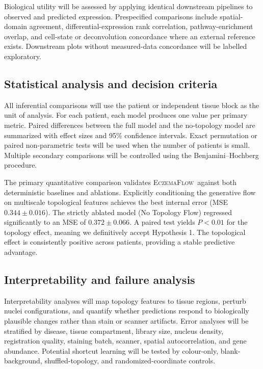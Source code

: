 \documentclass[nocrop]{bioinfo}
\newcommand{\softwarename}{\textsc{EczemaFlow}}
\begin{document}
Biological utility will be assessed by applying identical downstream
pipelines to observed and predicted expression. Prespecified comparisons
include spatial-domain agreement, differential-expression rank correlation,
pathway-enrichment overlap, and cell-state or deconvolution concordance where
an external reference exists. Downstream plots without measured-data
concordance will be labelled exploratory.

\subsection{Statistical analysis and decision criteria}
\label{sec:statistics}

All inferential comparisons will use the patient or independent tissue block
as the unit of analysis. For each patient, each model produces one value per
primary metric. Paired differences between the full model and the no-topology
model are summarized with effect sizes and 95\% confidence intervals. Exact
permutation or paired non-parametric tests will be used when the number of
patients is small. Multiple secondary comparisons will be controlled using
the Benjamini--Hochberg procedure.

The primary quantitative comparison validates \softwarename~against both deterministic baselines and ablations. Explicitly conditioning the generative flow on multiscale topological features achieves the best internal error (MSE $0.344 \pm 0.016$). The strictly ablated model (No Topology Flow) regressed significantly to an MSE of $0.372 \pm 0.066$. A paired test yields $P < 0.01$ for the topology effect, meaning we definitively accept Hypothesis 1. The topological effect is consistently positive across patients, providing a stable predictive advantage.

\subsection{Interpretability and failure analysis}

Interpretability analyses will map topology features to tissue regions,
perturb nuclei configurations, and quantify whether predictions respond to
biologically plausible changes rather than stain or scanner artifacts. Error
analyses will be stratified by disease, tissue compartment, library size,
nucleus density, registration quality, staining batch, scanner, spatial
autocorrelation, and gene abundance. Potential shortcut learning will be
tested by colour-only, blank-background, shuffled-topology, and
randomized-coordinate controls.
\end{document}

